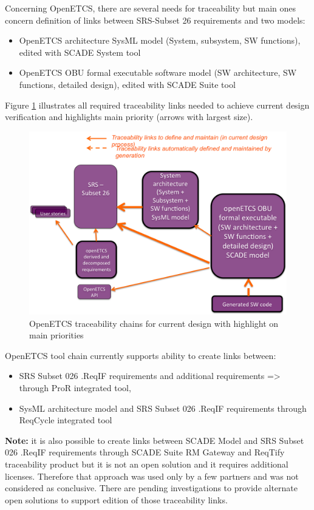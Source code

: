\documentclass{template/openetcs_report}
\begin{document}
Concerning OpenETCS, there are several needs for traceability but main ones concern definition of links between SRS-Subset 26 requirements and two models:
\begin{itemize}
\item OpenETCS architecture SysML model (System, subsystem, SW functions), edited with SCADE System tool
\item OpenETCS OBU formal executable software model (SW architecture, SW functions, detailed design), edited with SCADE Suite tool
\end{itemize}

Figure \ref{fig:openETCSTraceabilityMainPriority} illustrates all required traceability links needed to achieve current design verification and highlights main priority (arrows with largest size).

\begin{figure}[htbp]
\centering
\includegraphics[width=.9\linewidth]
{./images/openETCSTraceabilityMainPriority.png}
\caption{\label{fig:openETCSTraceabilityMainPriority}OpenETCS traceability chains for current design with highlight on main priorities}
\end{figure}

OpenETCS tool chain currently supports ability to create links between:
\begin{itemize}
\item SRS Subset 026 .ReqIF requirements and additional requirements => through ProR integrated tool,
\item SysML architecture model and SRS Subset 026 .ReqIF requirements through ReqCycle integrated tool
\end{itemize}
 
\textbf{Note:} it is also possible to create links between SCADE Model and SRS Subset 026 .ReqIF requirements through SCADE Suite RM Gateway and ReqTify traceability product but it is not an open solution and it requires additional licenses. Therefore that approach was used only by a few partners and was not considered as conclusive. There are pending investigations to provide alternate open solutions to support edition of those traceability links.
\end{document}
